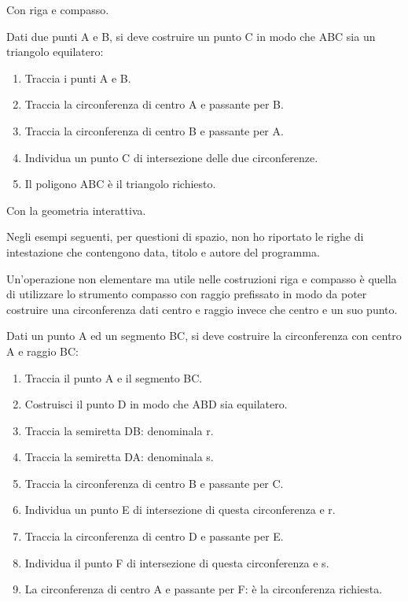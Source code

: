 Con riga e compasso.

\begin{procedura}\label{proc:fonda_equilatero}
  Dati due punti A e B, si deve costruire un punto C in modo che ABC sia un 
triangolo equilatero:
  \begin{enumerate} [nosep]
    \item 
    Traccia i punti A e B.
    \item 
    Traccia la circonferenza di centro A e passante per B.
    \item 
    Traccia la circonferenza di centro B e passante per A.
    \item 
    Individua un punto C di intersezione delle due circonferenze.
    \item 
    Il poligono ABC è il triangolo richiesto.    
  \end{enumerate}
\end{procedura}

Con la geometria interattiva.
\begin{osservazione}
 Negli esempi seguenti, per questioni di spazio, non ho riportato le righe di 
intestazione che contengono data, titolo e autore del programma.
\end{osservazione}


Un'operazione non elementare ma utile nelle costruzioni riga e compasso è 
quella di utilizzare lo strumento compasso con raggio prefissato in modo da 
poter costruire una circonferenza dati centro e raggio invece che centro e un 
suo punto.

\begin{procedura}\label{proc:fonda_comp_rig}
  Dati un punto A ed un segmento BC, si deve costruire la circonferenza con 
centro A e raggio BC:
  \begin{enumerate} [nosep]
    \item 
    Traccia il punto A e il segmento BC.
    \item 
    Costruisci il punto D in modo che ABD sia equilatero.
    \item 
    Traccia la semiretta DB: denominala r.
    \item 
    Traccia la semiretta DA: denominala s.
    \item 
    Traccia la circonferenza di centro B e passante per C.
    \item 
    Individua un punto E di intersezione di questa circonferenza e r.
    \item 
    Traccia la circonferenza di centro D e passante per E.
    \item 
    Individua il punto F di intersezione di questa circonferenza e s.
    \item 
    La circonferenza di centro A e passante per F: è la circonferenza 
richiesta.    
  \end{enumerate}
\end{procedura}

